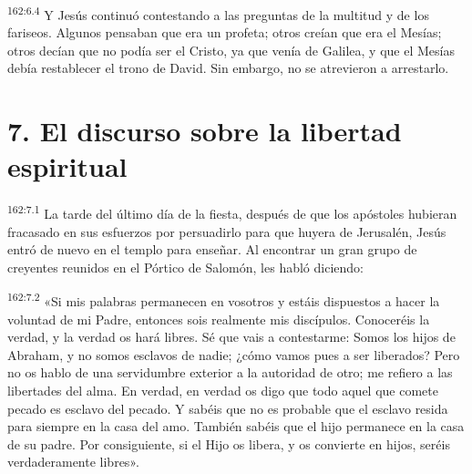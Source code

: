 \par 
\textsuperscript{162:6.4} Y Jesús continuó contestando a las preguntas de la multitud y de los fariseos. Algunos pensaban que era un profeta; otros creían que era el Mesías; otros decían que no podía ser el Cristo, ya que venía de Galilea, y que el Mesías debía restablecer el trono de David. Sin embargo, no se atrevieron a arrestarlo.

\section*{7. El discurso sobre la libertad espiritual}
\par 
\textsuperscript{162:7.1} La tarde del último día de la fiesta, después de que los apóstoles hubieran fracasado en sus esfuerzos por persuadirlo para que huyera de Jerusalén, Jesús entró de nuevo en el templo para enseñar. Al encontrar un gran grupo de creyentes reunidos en el Pórtico de Salomón, les habló diciendo:

\par 
\textsuperscript{162:7.2} «Si mis palabras permanecen en vosotros y estáis dispuestos a hacer la voluntad de mi Padre, entonces sois realmente mis discípulos. Conoceréis la verdad, y la verdad os hará libres. Sé que vais a contestarme: Somos los hijos de Abraham, y no somos esclavos de nadie; ¿cómo vamos pues a ser liberados? Pero no os hablo de una servidumbre exterior a la autoridad de otro; me refiero a las libertades del alma. En verdad, en verdad os digo que todo aquel que comete pecado es esclavo del pecado. Y sabéis que no es probable que el esclavo resida para siempre en la casa del amo. También sabéis que el hijo permanece en la casa de su padre. Por consiguiente, si el Hijo os libera, y os convierte en hijos, seréis verdaderamente libres».

